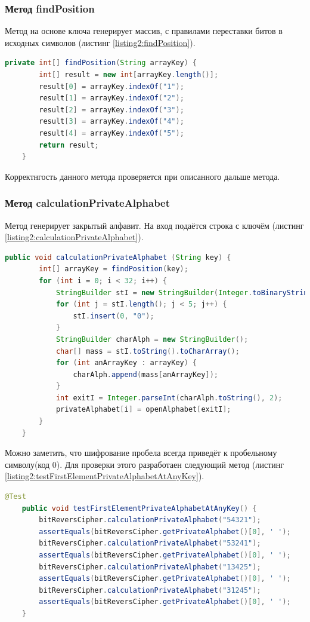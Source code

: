 \documentclass[a4paper,12pt]{article}
\begin{document}
\subsubsection{Метод findPosition}
Метод на основе ключа генерирует массив, с правилами переставки битов в исходных символов (листинг \ref{listing2:findPosition}).
\begin{lstlisting}[language=java, caption=метод findPosition, label=listing2:findPosition]
    private int[] findPosition(String arrayKey) {
        int[] result = new int[arrayKey.length()];
        result[0] = arrayKey.indexOf("1");
        result[1] = arrayKey.indexOf("2");
        result[2] = arrayKey.indexOf("3");
        result[3] = arrayKey.indexOf("4");
        result[4] = arrayKey.indexOf("5");
        return result;
    }
\end{lstlisting}
Корректнгость данного метода проверяется при описанного дальше метода.
\subsubsection{Метод calculationPrivateAlphabet}
Метод генерирует закрытый алфавит. На вход подаётся строка с ключём (листинг \ref{listing2:calculationPrivateAlphabet}).
\begin{lstlisting}[language=java, caption=метод calculationPrivateAlphabet, label=listing2:calculationPrivateAlphabet]
    public void calculationPrivateAlphabet (String key) {
        int[] arrayKey = findPosition(key);
        for (int i = 0; i < 32; i++) {
            StringBuilder stI = new StringBuilder(Integer.toBinaryString(i));
            for (int j = stI.length(); j < 5; j++) {
                stI.insert(0, "0");
            }
            StringBuilder charAlph = new StringBuilder();
            char[] mass = stI.toString().toCharArray();
            for (int anArrayKey : arrayKey) {
                charAlph.append(mass[anArrayKey]);
            }
            int exitI = Integer.parseInt(charAlph.toString(), 2);
            privateAlphabet[i] = openAlphabet[exitI];
        }
    }
\end{lstlisting}

Можно заметить, что шифрование пробела всегда приведёт к пробельному символу(код 0). Для проверки этого разработаен следующий метод (листинг \ref{listing2:testFirstElementPrivateAlphabetAtAnyKey}).
\begin{lstlisting}[language=java, caption=метод calculationPrivateAlphabet, label=listing2:testFirstElementPrivateAlphabetAtAnyKey]
    @Test
    public void testFirstElementPrivateAlphabetAtAnyKey() {
        bitReversCipher.calculationPrivateAlphabet("54321");
        assertEquals(bitReversCipher.getPrivateAlphabet()[0], ' ');
        bitReversCipher.calculationPrivateAlphabet("53241");
        assertEquals(bitReversCipher.getPrivateAlphabet()[0], ' ');
        bitReversCipher.calculationPrivateAlphabet("13425");
        assertEquals(bitReversCipher.getPrivateAlphabet()[0], ' ');
        bitReversCipher.calculationPrivateAlphabet("31245");
        assertEquals(bitReversCipher.getPrivateAlphabet()[0], ' ');
    }
\end{lstlisting}
\end{document}
